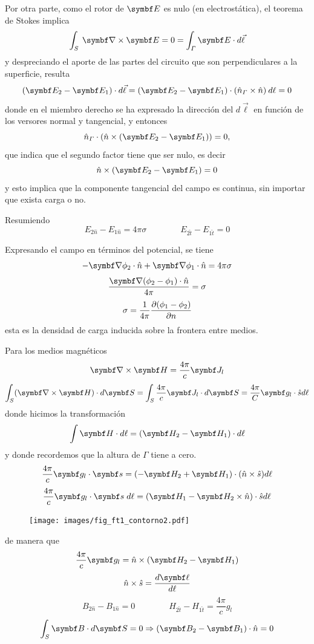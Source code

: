 \documentclass[10pt,oneside]{CBFT_book}
\begin{document}
Por otra parte, como el rotor de $\vb{E}$ es nulo (en electrostática), el teorema de Stokes implica
\[
	\int_{S} \: \rotorm{E} = 0 = \int_{\Gamma} \vb{E} \cdot d \vec{\ell} 
\]
y despreciando el aporte de las partes del circuito que son perpendiculares a la superficie, resulta
\[
	( \vb{E}_2 - \vb{E}_1 ) \cdot d\vec{\ell}  = 
	( \vb{E}_2 - \vb{E}_1 ) \cdot ( \hat{n}_\Gamma \times \hat{n} ) \: d\ell = 0
\]
donde en el miembro derecho se ha expresado la dirección del $d\vec{\ell}$ en función de los versores
normal y tangencial, y entonces
\[
	\hat{n}_\Gamma \cdot ( \hat{n} \times  ( \vb{E}_2 - \vb{E}_1 ) ) = 0,
\]
que indica que el segundo factor tiene que ser nulo, es decir 
\[
	 \hat{n} \times  ( \vb{E}_2 - \vb{E}_1 ) = 0
\]
y esto implica que la componente tangencial del campo es continua, sin importar que exista carga o no.

Resumiendo
\[
	E_{2\hat{n}} - E_{1\hat{n}} = 4 \pi \sigma \qquad \qquad E_{2\hat{t}} -E_{1\hat{t}} = 0
\]

Expresando el campo en términos del potencial, se tiene
\[
	-\Nabla\phi_2\cdot\hat{n} + \Nabla\phi_1\cdot\hat{n} = 4 \pi \sigma
\]
\[
	\frac{\Nabla(\phi_2-\phi_1)\cdot \hat{n}}{4 \pi} = \sigma
\]
\[
	\sigma = \frac{1}{4\pi}\frac{\partial^{\hspace{-0.05em}} {(\phi_1-\phi_2)}}{\partial {n}^{\hspace{-0.05em}}}
\]
esta es la densidad de carga inducida sobre la frontera entre medios.

Para los medios magnéticos
\[
	\rotorm{H} = \frac{4 \pi}{c} \vb{J}_l
\]
\[
	\int_S (\rotorm{H}) \cdot d\vb{S} = \int_S \frac{4 \pi}{c} \vb{J}_l \cdot d\vb{S} = 
	\frac{4 \pi}{C} \vb{g}_l\cdot \hat{s} d\ell
\]
donde hicimos la transformación
\[
	\int \vb{H}\cdot d\ell = (\vb{H}_2-\vb{H}_1)\cdot d\ell
\]
y donde recordemos que la altura de $\Gamma$ tiene a cero.
\[
	\frac{4 \pi}{c} \vb{g}_l \cdot \vb{s} = ( -\vb{H}_2 + \vb{H}_1 )\cdot( \hat{n} \times \hat{s} ) d\ell
\]
\[
	\frac{4 \pi}{c} \vb{g}_l \cdot \vb{s} \; d\ell = (\vb{H}_1 -\vb{H}_2 \times \hat{n})\cdot \hat{s} 
d\ell
\]

\begin{figure}[htb]
	\begin{center}
	\texttt{[image: images/fig\_ft1\_contorno2.pdf]}	 
	\end{center}
	\caption{}
\end{figure} 

de manera que 
\[
	\frac{4 \pi}{c} \vb{g}_l = \hat{n} \times ( \vb{H}_2 - \vb{H}_1 )
\]
\[
	\hat{n}\times\hat{s} = \frac{d\vb{\ell}}{d\ell} 
\]
\[
	B_{2\hat{n}} - B_{1\hat{n}} = 0 \qquad \qquad H_{2\hat{t}} - H_{1\hat{t}} = \frac{4 \pi}{c} g_l
\]
\[
	\int_S \vb{B}\cdot d\vb{S} = 0 \Rightarrow (\vb{B}_2 - \vb{B}_1 )\cdot\hat{n} = 0
\]
\end{document}
